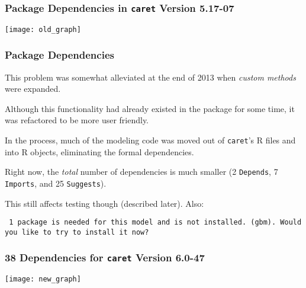 \documentclass[12 pt]{beamer}\usepackage[]{graphicx}\usepackage[]{color}
\newcommand{\pkg}[1]{{\fontseries{b}\selectfont #1}}
\renewcommand{\pkg}[1]{{\color{darkgreen}\texttt{#1}}}
\begin{document}

  \begin{frame}[fragile]
\frametitle{Package Dependencies in \pkg{caret} Version 5.17-07}
\vspace{-.5in}
  \begin{center}
    \texttt{[image: old\_graph]}
  \end{center}

\end{frame}



\begin{frame}[fragile]
\frametitle{Package Dependencies}

This problem was somewhat alleviated at the end of 2013 when {\em custom methods} were expanded.

\vspace{.1in}

Although this functionality had already existed in the package for some time, it was refactored to be more user friendly.

\vspace{.1in}

In the process, much of the modeling code was moved out of \pkg{caret}'s R files and into R objects, eliminating the formal dependencies.

\vspace{.1in}

Right now, the {\em total} number of dependencies is much smaller (2 \texttt{Depends}, 7 \texttt{Imports}, and 25 \texttt{Suggests}).

\vspace{.1in}

This still affects testing though (described later). Also:

\vspace{.1in}

{\tt \color{darkblue} \footnotesize 1 package is needed for this model and is not installed. (gbm). Would you like to try to install it now?}

\end{frame}



  \begin{frame}[fragile]
\frametitle{38 Dependencies for \pkg{caret} Version 6.0-47 }
\vspace{-.5in}
  \begin{center}
    \texttt{[image: new\_graph]}
  \end{center}

\end{frame}
\end{document}
